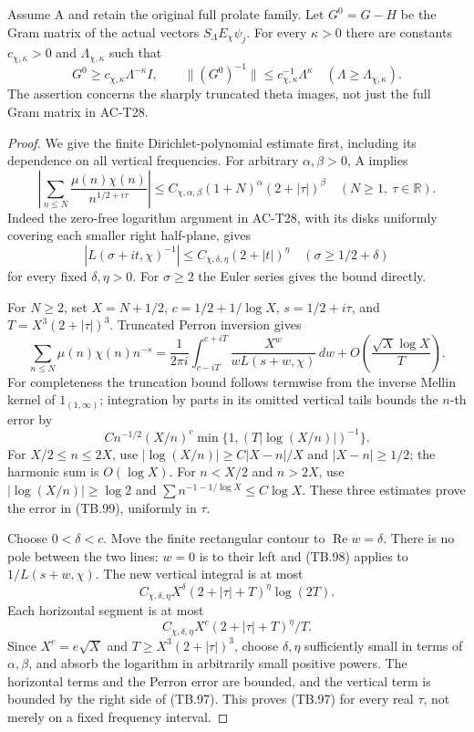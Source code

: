 \begin{theorem}
\label{AC-T35}
Assume A and retain the original full prolate family.
Let \(G^0=G-H\) be the Gram matrix of the actual vectors
\(S_\Lambda E_\chi\psi_j\).
For every \(\kappa>0\) there are constants
\(c_{\chi,\kappa}>0\) and \(\Lambda_{\chi,\kappa}\) such that
\[
 G^0\geq c_{\chi,\kappa}\Lambda^{-\kappa}I,
 \qquad
 \|(G^0)^{-1}\|\leq c_{\chi,\kappa}^{-1}\Lambda^\kappa
       \quad(\Lambda\geq\Lambda_{\chi,\kappa}).
 \tag{TB.96}
\]
The assertion concerns the sharply truncated theta images,
not just the full Gram matrix in AC-T28.
\end{theorem}
\begin{proof}
We give the finite Dirichlet-polynomial estimate first,
including its dependence on all vertical frequencies.
For arbitrary \(\alpha,\beta>0\), A implies
\[
 \left|\sum_{n\leq N}
      \frac{\mu(n)\chi(n)}{n^{1/2+i\tau}}\right|
       \leq C_{\chi,\alpha,\beta}
                    (1+N)^\alpha(2+|\tau|)^\beta
       \quad(N\geq1,\ \tau\in\mathbb R).
 \tag{TB.97}
\]
Indeed the zero-free logarithm argument in AC-T28, with
its disks uniformly covering each smaller right half-plane,
gives
\[
 |L(\sigma+it,\chi)^{-1}|
       \leq C_{\chi,\delta,\eta}(2+|t|)^\eta
       \quad(\sigma\geq1/2+\delta)
 \tag{TB.98}
\]
for every fixed \(\delta,\eta>0\).
For \(\sigma\geq2\) the Euler series gives the bound directly.

For \(N\geq2\), set \(X=N+1/2\),
\(c=1/2+1/\log X\), \(s=1/2+i\tau\), and
\(T=X^3(2+|\tau|)^3\).
Truncated Perron inversion gives
\[
 \sum_{n\leq N}\mu(n)\chi(n)n^{-s}
   =\frac1{2\pi i}\int_{c-iT}^{c+iT}
        \frac{X^w}{wL(s+w,\chi)}\,dw
           +O\!\left(\frac{\sqrt X\log X}{T}\right).
 \tag{TB.99}
\]
For completeness the truncation bound follows termwise
from the inverse Mellin kernel of \(1_{(1,\infty)}\);
integration by parts in its omitted vertical tails bounds
the \(n\)-th error by
\[
 C n^{-1/2}(X/n)^c
             \min\{1,(T|\log(X/n)|)^{-1}\}.
 \]
For \(X/2\leq n\leq2X\), use
\(|\log(X/n)|\geq C|X-n|/X\) and
\(|X-n|\geq1/2\); the harmonic sum is \(O(\log X)\).
For \(n<X/2\) and \(n>2X\), use
\(|\log(X/n)|\geq\log2\) and
\(\sum n^{-1-1/\log X}\leq C\log X\).
These three estimates prove the error in (TB.99),
uniformly in \(\tau\).

Choose \(0<\delta<c\).
Move the finite rectangular contour to
\(\operatorname{Re}w=\delta\).
There is no pole between the two lines: \(w=0\) is to
their left and (TB.98) applies to \(1/L(s+w,\chi)\).
The new vertical integral is at most
\[
 C_{\chi,\delta,\eta}
         X^\delta(2+|\tau|+T)^\eta\log(2T).
 \]
Each horizontal segment is at most
\[
 C_{\chi,\delta,\eta}
         X^c(2+|\tau|+T)^\eta/T.
 \]
Since \(X^c=e\sqrt X\) and \(T\geq X^3(2+|\tau|)^3\),
choose \(\delta,\eta\) sufficiently small in terms of
\(\alpha,\beta\), and absorb the logarithm in arbitrarily
small positive powers.
The horizontal terms and the Perron error are bounded,
and the vertical term is bounded by the right side of
(TB.97).  This proves (TB.97) for every real \(\tau\),
not merely on a fixed frequency interval.


\end{proof}
